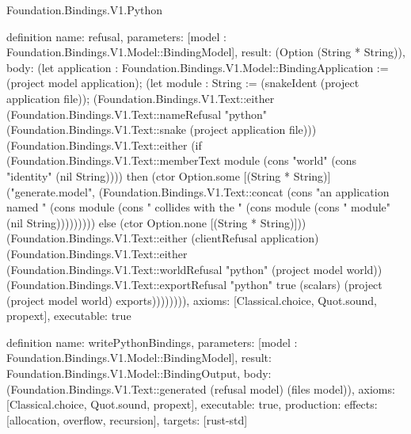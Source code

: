 \begin{lexlean}{Foundation.Bindings.V1.Python}
\begin{semanticmodule}
definition{
  name: refusal,
  parameters: [model : Foundation.Bindings.V1.Model::BindingModel],
  result: (Option (String * String)),
  body: (let application : Foundation.Bindings.V1.Model::BindingApplication := (project model application); (let module : String := (snakeIdent (project application file)); (Foundation.Bindings.V1.Text::either (Foundation.Bindings.V1.Text::nameRefusal "python" (Foundation.Bindings.V1.Text::snake (project application file))) (Foundation.Bindings.V1.Text::either (if (Foundation.Bindings.V1.Text::memberText module (cons "world" (cons "identity" (nil String)))) then (ctor Option.some [(String * String)] ("generate.model", (Foundation.Bindings.V1.Text::concat (cons "an application named " (cons module (cons " collides with the " (cons module (cons " module" (nil String))))))))) else (ctor Option.none [(String * String)])) (Foundation.Bindings.V1.Text::either (clientRefusal application) (Foundation.Bindings.V1.Text::either (Foundation.Bindings.V1.Text::worldRefusal "python" (project model world)) (Foundation.Bindings.V1.Text::exportRefusal "python" true (scalars) (project (project model world) exports)))))))),
  axioms: [Classical.choice, Quot.sound, propext],
  executable: true
}

definition{
  name: writePythonBindings,
  parameters: [model : Foundation.Bindings.V1.Model::BindingModel],
  result: Foundation.Bindings.V1.Model::BindingOutput,
  body: (Foundation.Bindings.V1.Text::generated (refusal model) (files model)),
  axioms: [Classical.choice, Quot.sound, propext],
  executable: true,
  production: {effects: [allocation, overflow, recursion], targets: [rust-std]}
}
\end{semanticmodule}
\end{lexlean}
